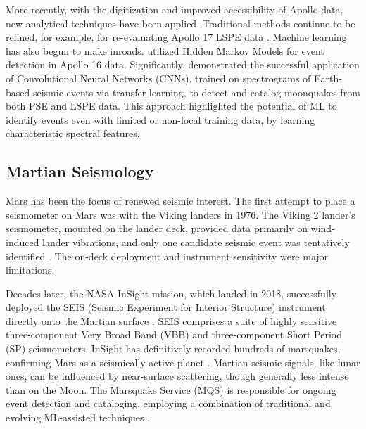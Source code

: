 \documentclass[conference]{IEEEtran}
\begin{document}
        More recently, with the digitization and improved accessibility of Apollo data, new analytical techniques have
        been applied. Traditional methods continue to be refined, for example, for re-evaluating Apollo 17 LSPE data
        \cite{Heffels2017}. Machine learning has also begun to make inroads.\cite{Knapmeyer2015} utilized Hidden Markov
        Models for event detection in Apollo 16 data. Significantly, \cite{Civilini2021} demonstrated the successful
        application of Convolutional Neural Networks (CNNs), trained on spectrograms of Earth-based seismic events via
        transfer learning, to detect and catalog moonquakes from both PSE and LSPE data. This approach highlighted the
        potential of ML to identify events even with limited or non-local training data, by learning characteristic
        spectral features.

    \subsection{ Martian Seismology}
        Mars has been the focus of renewed seismic interest. The first attempt to place a seismometer on Mars was with
        the Viking landers in 1976. The Viking 2 lander's seismometer, mounted on the lander deck, provided data
        primarily on wind-induced lander vibrations, and only one candidate seismic event was tentatively identified
        \cite{Anderson1977,Lognonne2005}. The on-deck deployment and instrument sensitivity were major limitations.

        Decades later, the NASA InSight mission, which landed in 2018, successfully deployed the SEIS (Seismic
        Experiment for Interior Structure) instrument directly onto the Martian surface \cite{Lognonne2019, Banerdt2020}. 
        SEIS comprises a suite of highly sensitive three-component Very Broad Band (VBB) and three-component Short
        Period (SP) seismometers. InSight has definitively recorded hundreds of marsquakes, confirming Mars as a
        seismically active planet \cite{Giardini2020,Clinton2021}. Martian seismic signals, like lunar ones, can be
        influenced by near-surface scattering, though generally less intense than on the Moon. The Marsquake Service
        (MQS) is responsible for ongoing event detection and cataloging, employing a combination of traditional and
        evolving ML-assisted techniques \cite{Clinton2021}.
\end{document}
